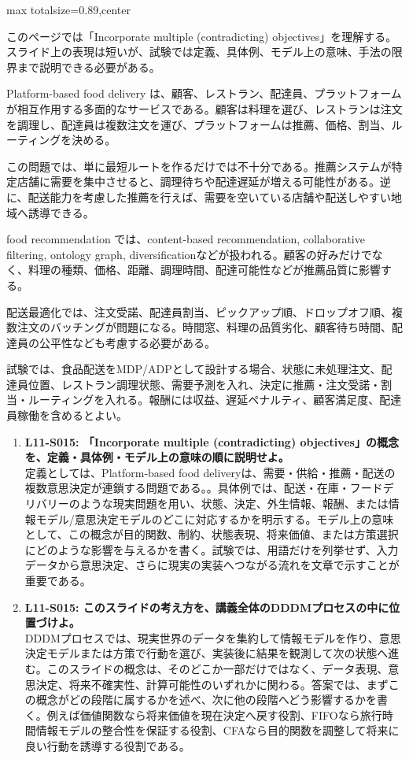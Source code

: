 \begin{minipage}[t]{0.58\textwidth}
\begin{adjustbox}{max totalsize={\textwidth}{0.89\textheight},center}
\begin{minipage}{\textwidth}\scriptsize
{}このページでは「Incorporate multiple (contradicting) objectives」を理解する。スライド上の表現は短いが、試験では定義、具体例、モデル上の意味、手法の限界まで説明できる必要がある。\par
Platform-based food delivery は、顧客、レストラン、配達員、プラットフォームが相互作用する多面的なサービスである。顧客は料理を選び、レストランは注文を調理し、配達員は複数注文を運び、プラットフォームは推薦、価格、割当、ルーティングを決める。\par
この問題では、単に最短ルートを作るだけでは不十分である。推薦システムが特定店舗に需要を集中させると、調理待ちや配達遅延が増える可能性がある。逆に、配送能力を考慮した推薦を行えば、需要を空いている店舗や配送しやすい地域へ誘導できる。\par
food recommendation では、content-based recommendation, collaborative filtering, ontology graph, diversificationなどが扱われる。顧客の好みだけでなく、料理の種類、価格、距離、調理時間、配達可能性などが推薦品質に影響する。\par
配送最適化では、注文受諾、配達員割当、ピックアップ順、ドロップオフ順、複数注文のバッチングが問題になる。時間窓、料理の品質劣化、顧客待ち時間、配達員の公平性なども考慮する必要がある。\par
試験では、食品配送をMDP/ADPとして設計する場合、状態に未処理注文、配達員位置、レストラン調理状態、需要予測を入れ、決定に推薦・注文受諾・割当・ルーティングを入れる。報酬には収益、遅延ペナルティ、顧客満足度、配達員稼働を含めるとよい。\par{}\begin{enumerate}\item \textbf{L11-S015: 「Incorporate multiple (contradicting) objectives」の概念を、定義・具体例・モデル上の意味の順に説明せよ。}\\定義としては、Platform-based food deliveryは、需要・供給・推薦・配送の複数意思決定が連鎖する問題である。。具体例では、配送・在庫・フードデリバリーのような現実問題を用い、状態、決定、外生情報、報酬、または情報モデル/意思決定モデルのどこに対応するかを明示する。モデル上の意味として、この概念が目的関数、制約、状態表現、将来価値、または方策選択にどのような影響を与えるかを書く。試験では、用語だけを列挙せず、入力データから意思決定、さらに現実の実装へつながる流れを文章で示すことが重要である。\item \textbf{L11-S015: このスライドの考え方を、講義全体のDDDMプロセスの中に位置づけよ。}\\DDDMプロセスでは、現実世界のデータを集約して情報モデルを作り、意思決定モデルまたは方策で行動を選び、実装後に結果を観測して次の状態へ進む。このスライドの概念は、そのどこか一部だけではなく、データ表現、意思決定、将来不確実性、計算可能性のいずれかに関わる。答案では、まずこの概念がどの段階に属するかを述べ、次に他の段階へどう影響するかを書く。例えば価値関数なら将来価値を現在決定へ戻す役割、FIFOなら旅行時間情報モデルの整合性を保証する役割、CFAなら目的関数を調整して将来に良い行動を誘導する役割である。\end{enumerate}

\end{minipage}
\end{adjustbox}
\end{minipage}
